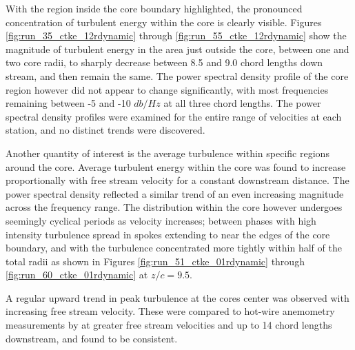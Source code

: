 



With the region inside the core boundary highlighted, the pronounced 
concentration of turbulent energy within the core is clearly visible. Figures 
\ref{fig:run_35_ctke_12rdynamic} through \ref{fig:run_55_ctke_12rdynamic} show 
the magnitude of turbulent energy in the area just outside the core, between 
one and two core radii, to sharply decrease between 8.5 and 9.0 chord lengths 
down stream, and then remain the same. The 
power spectral density profile of the core region however did not appear to 
change significantly, with most frequencies remaining between -5 and -10 
$db/Hz$ at all three chord lengths. The power spectral density profiles were 
examined for the entire range of velocities at each station, and no distinct 
trends were discovered.





Another quantity of interest is the average turbulence within specific regions 
around the core. Average turbulent energy within the core was found to increase 
proportionally with free stream velocity for a constant downstream distance. 
The power spectral density reflected 
a similar trend of an even increasing magnitude across the frequency range. The 
distribution within the core however undergoes seemingly cyclical periods as 
velocity increases; between phases with high intensity turbulence spread in 
spokes extending to near the edges of the core boundary, and with the 
turbulence concentrated more tightly within half of the total radii as shown in 
Figures \ref{fig:run_51_ctke_01rdynamic} through 
\ref{fig:run_60_ctke_01rdynamic} at $z/c = 9.5$.












A regular upward trend in peak turbulence at the cores center was observed with 
increasing free stream velocity. These were compared to hot-wire anemometry 
measurements by \cite{thompson2016} at greater free stream velocities and up to 
14 chord lengths downstream, and found to be consistent.

